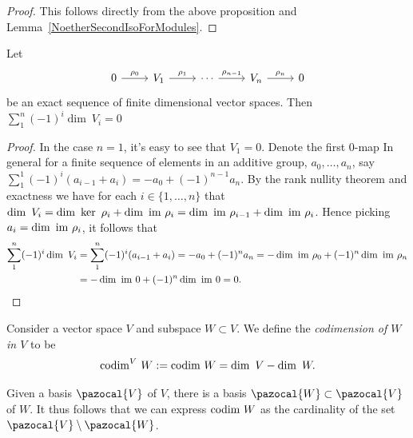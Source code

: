     \begin{proof}
        This follows directly from the above proposition and Lemma~\ref{NoetherSecondIsoForModules}. 
    \end{proof}
    \begin{lemma}
        Let 
        $$\begin{tikzcd}
            0 \arrow[r,"\rho_0"] &V_1\arrow[r,"\rho_1"] & \cdots \arrow[r,"\rho_{n-1}"] & V_n\arrow[r,"\rho_n"] & 0
        \end{tikzcd}$$
        be an exact sequence of finite dimensional vector spaces. Then $\sum_1^n (-1)^i \dim\ V_i = 0$
    \end{lemma}
    \begin{proof}
        In the case $n=1$, it's easy to see that $V_1=0$. Denote the first $0$-map
        In general for a finite sequence of elements in an additive group, $a_0,\dots,a_n$, say $\sum_{1}^{1} (-1)^i(a_{i-1}+a_{i})= -a_0+(-1)^{n-1} a_n$. By the rank nullity theorem and exactness we have for each $i\in\{1,\dots,n\}$ that $\dim\ V_i = \dim\ \ker \ \rho_i +\dim \ \im \ \rho_i = \dim \ \im \ \rho_{i-1 } + \dim \ \im \ \rho_i$. Hence picking $a_i = \dim \ \im\ \rho_i$, it follows that 
        \begin{align*}
            \sum_1^n (-1)^i\dim\ V_i &= \sum_1^n (-1)^i(a_{i-1}+a_i)= -a_0 + (-1)^na_n = -\dim\ \mathrm{im} \ \rho_0 +(-1)^n \dim\ \mathrm{im} \ \rho_n\\ &= -\dim\ \mathrm{im} \ 0 +(-1)^n \dim\ \mathrm{im} \ 0 = 0.
        \end{align*}
    \end{proof}
    \begin{definition}
        Consider a vector space $V$ and subspace $W\subset V$. We define the \emph{codimension of $W$ in $V$} to be 
        $$
            \mathrm{codim}^V \ W := \mathrm{codim}\ W = \dim \ V - \dim \ W.
        $$
    \end{definition}
    \begin{remark}
        Given a basis $\pazocal{V}$ of $V$, there is a basis $\pazocal{W}\subset \pazocal{V}$ of $W$. It thus follows that we can express $\codim\ W$ as the cardinality of the set $\pazocal{V}\setminus \pazocal{W}$.
    \end{remark}
    
